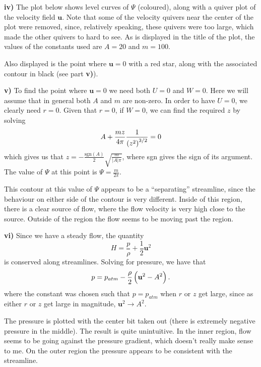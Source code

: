 \documentclass{article}
\def\*#1{\mathbf{#1}}
\begin{document}
\textbf{iv)} The plot below shows level curves of $\Psi$ (coloured),
along with a quiver plot of the velocity field $\*u$. Note that some of
the velocity quivers near the center of the plot were removed, since,
relatively speaking, these quivers were too large, which made the other
quivers to hard to see. As is displayed in the title of the plot, the
values of the constants used are $A = 20$ and $m = 100$.

Also displayed is the point where $\*u = 0$ with a red star, along with
the associated contour in black (see part \textbf{v)}).

\textbf{v)} To find the point where $\*u = 0$ we need both $U = 0$ and $W =
0$. Here we will assume that in general both $A$ and $m$ are non-zero.
In order to have $U = 0$, we clearly need $r = 0$. Given that $r = 0$, if
$W = 0$, we can find the required $z$ by solving
%
\begin{equation*}
    A + \frac{m z}{4 \pi} \frac{1}{\del{z^2}^{3/2}} = 0
\end{equation*}
%
which gives us that $z = - \frac{\text{sgn}(A)}{2} \sqrt{\frac{m}{|A|
\pi}}$, where sgn gives the sign of its argument. The value of $\Psi$ at
this point is $\Psi = \frac{m}{2 \pi}$.

This contour at this value of $\Psi$ appears to be a ``separating''
streamline, since the behaviour on either side of the contour is very
different. Inside of this region, there is a clear source of flow, where
the flow velocity is very high close to the source. Outside of the
region the flow seems to be moving past the region.

\textbf{vi)} Since we have a steady flow, the quantity
%
\begin{equation*}
    H = \frac{p}{\rho} + \frac{1}{2} \*u^2
\end{equation*}
%
is conserved along streamlines. Solving for pressure, we have that
%
\begin{equation*}
    p = p_{atm} - \frac{\rho}{2} \del{\*u^2 - A^2}
    .
\end{equation*}
%
where the constant was chosen such that $p = p_{atm}$ when $r$ or $z$
get large, since as either $r$ or $z$ get large in magnitude, $\*u^2 \to
A^2$.

The pressure is plotted with the center bit taken out (there is
extremely negative pressure in the middle). The result is quite
unintuitive. In the inner region, flow seems to be going against the
pressure gradient, which doesn't really make sense to me. On the outer
region the pressure appears to be consistent with the streamline.
\end{document}

